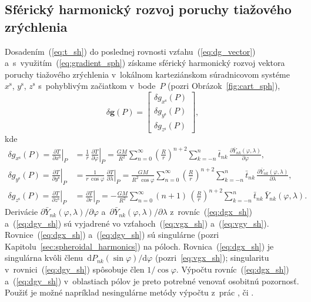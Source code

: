\documentclass[a4paper,12pt]{book}
\newcommand{\diff}{\mathrm d}
\let\vec\mathbf
\begin{document}
\subsection{Sférický harmonický rozvoj poruchy tiažového zrýchlenia}

Dosadením~(\ref{eq:t_sh}) do poslednej rovnosti vzťahu~(\ref{eq:dg_vector}) 
a~s~využitím~(\ref{eq:gradient_sph}) získame sférický harmonický rozvoj vektora 
poruchy tiažového zrýchlenia v~lokálnom karteziánskom súradnicovom 
systéme~$x^\mathrm{s}$, $y^\mathrm{s}$, $z^\mathrm{s}$ s~pohyblivým začiatkom 
v~bode~$P$ (pozri Obrázok~\ref{fig:cart_sph}),
%
\begin{equation}
\label{eq:dg_vec_sph}
\delta \vec g(P) =
%
\begin{bmatrix}
\delta g_{x^\mathrm{s}}(P)\\
\delta g_{y^\mathrm{s}}(P)\\
\delta g_{z^\mathrm{s}}(P)
\end{bmatrix}
%
{,}
\end{equation}
%
kde
%
\begin{align}
\label{eq:dgx_sh}
\delta g_{x^\mathrm{s}}(P) = \left.\frac{\partial T}{\partial 
x^\mathrm{s}}\right|_P &= \frac{1}{r} \, \left.\frac{\partial T}{\partial 
\varphi}\right|_P = \frac{GM}{R^2} \sum_{n = 0}^\infty \left( \frac{R}{r} 
\right)^{n + 2} \sum_{k = -n}^{n} \bar{t}_{nk} \, \frac{\partial 
\bar{Y}_{nk}(\varphi, \lambda)}{\partial \varphi}{,}\\
%
\label{eq:dgy_sh}
\delta g_{y^\mathrm{s}}(P) = \left.\frac{\partial T}{\partial 
y^\mathrm{s}}\right|_P &= \frac{1}{r \, \cos\varphi} \, \left.\frac{\partial 
T}{\partial \lambda}\right|_P = \frac{GM}{R^2 \, \cos\varphi} \sum_{n 
= 0}^\infty \left( \frac{R}{r} \right)^{n + 2} \sum_{k = -n}^{n}\bar{t}_{nk} \, 
\frac{\partial \bar{Y}_{nk}(\varphi, \lambda)}{\partial \lambda}{,}\\
%
\label{eq:dgz_sh}
\delta g_{z^\mathrm{s}}(P) = \left.\frac{\partial T}{\partial 
z^\mathrm{s}}\right|_P &= \left.\frac{\partial T}{\partial r}\right|_P 
= - \frac{GM}{R^2} \sum_{n = 0}^\infty (n + 1) \, \left( \frac{R}{r} \right)^{n 
+ 2} \sum_{k = -n}^{n} \bar{t}_{nk} \, \bar{Y}_{nk}(\varphi, \lambda){.}
\end{align}
%
Derivácie $\partial \bar{Y}_{nk}(\varphi, \lambda) \slash \partial \varphi$ 
a~$\partial \bar{Y}_{nk}(\varphi, \lambda) \slash \partial \lambda$ 
z~rovníc~(\ref{eq:dgx_sh}) a~(\ref{eq:dgy_sh}) sú vyjadrené vo 
vzťahoch~(\ref{eq:vgx_sh}) a~(\ref{eq:vgy_sh}).  Rovnice~(\ref{eq:dgx_sh}) 
a~(\ref{eq:dgy_sh}) sú singulárne (pozri 
Kapitolu~\ref{sec:spheroidal_harmonics}) na póloch.  Rovnica~(\ref{eq:dgx_sh}) 
je singulárna kvôli členu~$\diff P_{nk}(\sin\varphi) \slash \diff \varphi$ 
(pozri~\ref{eq:vgx_sh}); singularitu v~rovnici~(\ref{eq:dgy_sh}) spôsobuje člen 
$1 \slash \cos\varphi$.  Výpočtu rovníc~(\ref{eq:dgx_sh}) a~(\ref{eq:dgy_sh}) 
v~oblastiach pólov je preto potrebné venovať osobitnú pozornosť.  Použiť je 
možné napríklad nesingulárne metódy výpočtu z~prác \textcite{Petrovskaya2012}, 
\textcite{Sebera2013} či \textcite{Ivanov2018}.
\end{document}
